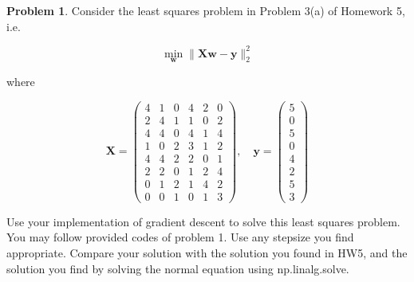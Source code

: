 \documentclass{article}
\theoremstyle{definition}
\newtheorem{prob}{Problem}
\begin{document}
	\begin{prob}
	Consider the least squares problem in Problem 3(a) of Homework 5, i.e.

	$$
	\min _{\boldsymbol{w}}\|\boldsymbol{X} \boldsymbol{w}-\boldsymbol{y}\|_{2}^{2}
	$$
	
	where
	
	$$
	\boldsymbol{X}=\left(\begin{array}{cccccc}
		4 & 1 & 0 & 4 & 2 & 0 \\
		2 & 4 & 1 & 1 & 0 & 2 \\
		4 & 4 & 0 & 4 & 1 & 4 \\
		1 & 0 & 2 & 3 & 1 & 2 \\
		4 & 4 & 2 & 2 & 0 & 1 \\
		2 & 2 & 0 & 1 & 2 & 4 \\
		0 & 1 & 2 & 1 & 4 & 2 \\
		0 & 0 & 1 & 0 & 1 & 3
	\end{array}\right), \quad \boldsymbol{y}=\left(\begin{array}{l}
		5 \\
		0 \\
		5 \\
		0 \\
		4 \\
		2 \\
		5 \\
		3
	\end{array}\right)
	$$
	
	Use your implementation of gradient descent to solve this least squares problem. You may follow provided codes of problem 1. Use any stepsize you find appropriate. Compare your solution with the solution you found in HW5, and the solution you find by solving the normal equation using np.linalg.solve.
	\end{prob}
\end{document}
